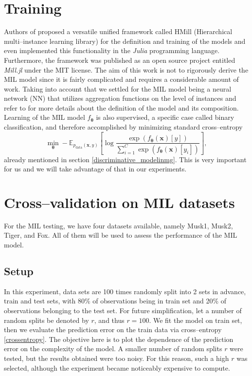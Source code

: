 \section{Training}\label{MILtraining}
Authors of \cite{mandlik} proposed a versatile unified framework called HMill (Hierarchical multi--instance learning library) for the definition and training of the models and even implemented this functionality in the \emph{Julia} programming language. Furthermore, the framework was published as an open source project entitled \emph{Mill.jl} under the MIT license. The aim of this work is not to rigorously derive the MIL model since it is fairly complicated and requires a considerable amount of work. Taking into account that we settled for the MIL model being a neural network (NN) that utilizes aggregation functions on the level of instances and refer to \cite{mandlik} for more details about the definition of the model and its composition.   
Learning of the MIL model $f_{\boldsymbol{\theta}}$ is also supervised, a specific case called binary classification, and therefore accomplished by minimizing standard cross--entropy 
\begin{equation}\label{crossentropy52}
	\min_{\boldsymbol{\theta}}- \mathbb{E}_{p_{\mathrm{data}}(\boldsymbol{x},y) }\left[\log \frac{\exp\left({f_{\boldsymbol{\theta}}\left(\boldsymbol{x}\right)[y]}\right)}{\sum_{i=1}^C\exp\left({f_{\boldsymbol{\theta}}\left(\boldsymbol{x}\right)[y_i]}\right)} \right],
\end{equation}   
already mentioned in section \ref{discriminative_modelinmg}. This is very important for us and we will take advantage of that in our experiments.
 
\section{Cross--validation on MIL datasets}\label{experimentCV}
For the MIL testing, we have four datasets available, namely Musk1, Musk2, Tiger, and Fox. All of them will be used to assess the performance of the MIL model.
\subsection{Setup}
In this experiment, data sets are 100 times randomly split into 2 sets in advance, train and test sets, with 80\% of observations being in train set and 20\% of observations belonging to the test set. For future simplification, let a number of random splits be denoted by $r$, and thus $r=100$.  We fit the model on train set, then we evaluate the prediction error on the train data via cross--entropy \ref{crossentropy}. The objective here is to plot the dependence of the prediction error on the complexity of the model. A smaller number of random splits $r$ were tested, but the results obtained were too noisy. For this reason, such a high $r$ was selected, although the experiment became noticeably expensive to compute.    \\

